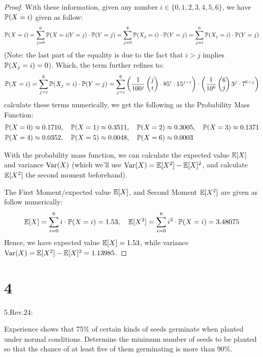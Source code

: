 \documentclass{article}
\begin{document}
\begin{proof}
    \hfil

    With these information, given any number $i\in\{0,1,2,3,4,5,6\}$, we have $\mathbb{P}(X=i)$ given as follow:
    \begin{align}
        \mathbb{P}(X=i)=\sum_{j=0}^{6}\mathbb{P}(X=i|Y=j)\cdot \mathbb{P}(Y=j) = \sum_{j=0}^{6}\mathbb{P}(X_j=i)\cdot\mathbb{P}(Y=j) = \sum_{j=i}^{6}\mathbb{P}(X_j=i)\cdot\mathbb{P}(Y=j)
    \end{align} 
    (Note: the last part of the equality is due to the fact that $i>j$ implies $\mathbb{P}(X_j=i)=0$). Which, the term further refines to:
    \begin{align}
        \mathbb{P}(X=i) = \sum_{j=i}^{6}\mathbb{P}(X_j=i)\cdot\mathbb{P}(Y=j) = \sum_{j=i}^{6}\left(\frac{1}{100^j}\begin{pmatrix}j\\i\end{pmatrix}\cdot 85^i\cdot 15^{j-i}\right)\cdot \left(\frac{1}{10^6}\begin{pmatrix}6\\j\end{pmatrix}3^j\cdot 7^{6-j}\right)
    \end{align}
    calculate these terms numerically, we get the following as the Probability Mass Function:
    \begin{align}
        &\mathbb{P}(X=0)\approx 0.1710,\quad \mathbb{P}(X=1)\approx 0.3511,\quad \mathbb{P}(X=2)\approx 0.3005,\quad \mathbb{P}(X=3)\approx 0.1371\\
        &\mathbb{P}(X=4)\approx 0.0352,\quad \mathbb{P}(X=5)\approx 0.0048,\quad \mathbb{P}(X=6)\approx 0.0003
    \end{align}

    With the probability mass function, we can calculate the expected value $\mathbb{E}[X]$ and variance $\mathrm{Var}(X)$ (which we'll use $\mathrm{Var}(X)=\mathbb{E}[X^2]-\mathbb{E}[X]^2$, and calculate $\mathbb{E}[X^2]$ the second moment beforehand).

    The First Moment/expected value $\mathbb{E}[X]$, and Second Moment $\mathbb{E}[X^2]$ are given as follow numerically:
    \begin{align}
        \mathbb{E}[X]=\sum_{i=0}^{6}i\cdot\mathbb{P}(X=i) = 1.53,\quad \mathbb{E}[X^2]=\sum_{i=0}^{6}i^2\cdot \mathbb{P}(X=i)=3.48075
    \end{align}
    Hence, we have expected value $\mathbb{E}[X]=1.53$, while variance $\mathrm{Var}(X)=\mathbb{E}[X^2]-\mathbb{E}[X]^2=1.13985$.
\end{proof}

\newpage
\section*{4}
\begin{ques}\label{q4}
    5.Rev.24:

    Experience shows that 75\% of certain kinds of seeds germinate when planted under normal conditions. Determine the minimum number of seeds to be planted so that the chance of at least five of them germinating is more than 90\%.
\end{ques}
\end{document}
